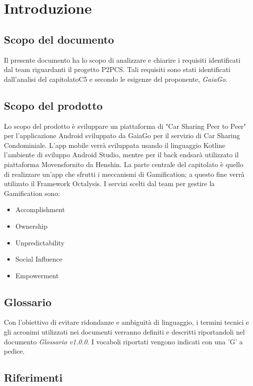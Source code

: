 \section{Introduzione} 
\subsection{Scopo del documento}
Il presente documento ha lo scopo di analizzare e chiarire i requisiti identificati dal team riguardanti il progetto P2PCS. Tali requisiti sono stati identificati dall'analisi del capitolato\glosp C5 e secondo le esigenze del proponente, \textit{GaiaGo}.
\subsection{Scopo del prodotto}
Lo scopo del prodotto è sviluppare un piattaforma di "Car Sharing Peer to Peer"  per l'applicazione Android sviluppato da GaiaGo per il servizio di Car Sharing Condominiale. L'app mobile verrà sviluppata usando il linguaggio Kotlin\glosp e l'ambiente di sviluppo Android Studio\glo, mentre per il back end\glosp sarà utilizzato il piattaforma Movens\glosp fornito da Henshin\glo. La parte centrale del capitolato è quello di realizzare un’app che sfrutti i meccanismi di Gamification\glo; a questo fine verrà utilizato il Framework Octalysis\glo. I servizi scelti dal team per gestire la Gamification sono:
\begin{itemize}
	\item {Accomplishment}
	\item {Ownership}
	\item {Unpredictability}
	\item {Social Influence}
	\item {Empowerment}
\end{itemize}

\subsection{Glossario}
Con l’obiettivo di evitare ridondanze e ambiguità di linguaggio, i termini tecnici e gli acronimi utilizzati nei documenti verranno definiti e descritti riportandoli nel documento \textit{Glossario v1.0.0}.  I vocaboli riportati vengono indicati con una 'G' a pedice.
\subsection{Riferimenti}
